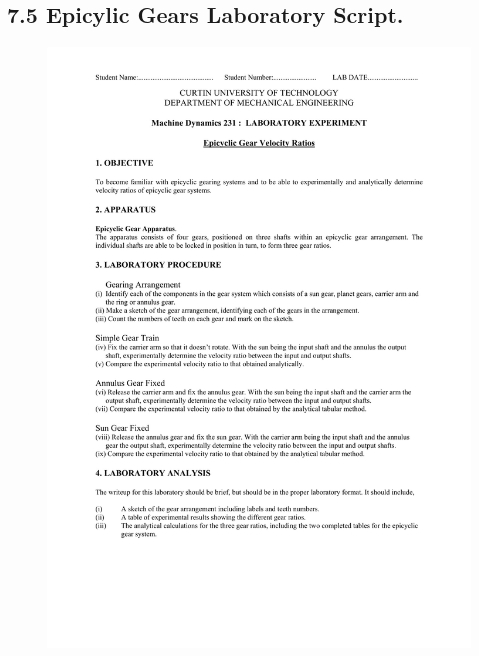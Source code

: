 \documentclass[12pt,a4paper]{report}
\begin{document}
\subsection*{7.5 Epicylic Gears Laboratory Script.}
\begin{figure}[H]
  \includegraphics[width=\linewidth]{lab3/lab3-1}
  \caption*{}
\label{}
\end{figure}
\end{document}
